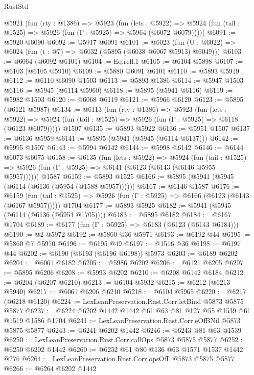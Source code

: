 \begin{lexlean}{RustStd}
\begin{coremodule}
{\begin{coremodule}
{{{{{{{{{{{{{{{{{{{{{{{{{{{{{{{{{{{  @5921
    (fun (rty : @1386) =>
    @5923
      (fun (lets : @5922) =>
      @5924 (fun (tail : @1525) => @5926 (fun (Γ : @5925) => @5964 (@6072 @6079)))))
@6091 := @5920 @6090
@6092 := @5917 @6091
@6101 := @6023 (fun (U : @6022) => @6024 (fun (t : @7) => @6032 (@5895 (@6038 @6067 @5913) @6049)))
@6103 := @6064 (@6092 @6101)
@6104 := Eq.refl.{1}
@6105 := @6104 @5898
@6107 := @6103 (@6105 @5910)
@6109 := @5880 @6091 @6101
@6110 := @5893 @5919
@6112 := @6110 @6090 @1503
@6113 := @5893 @1386
@6114 := @5947 @1503
@6116 := @5945 (@6114 @5960)
@6118 := @5895 (@5941 @6116)
@6119 := @5982 @1503
@6120 := @6068 @6119
@6121 := @5966 @6120
@6123 := @5895 (@6121 @5987)
@6134 := @6113
    (fun (rty : @1386) =>
    @5923
      (fun (lets : @5922) =>
      @5924 (fun (tail : @1525) => @5926 (fun (Γ : @5925) => @6118 (@6123 @6079)))))
    @1507
@6135 := @5893 @5922
@6136 := @5951 @1507
@6137 := @6136 @5959
@6141 := @5895 (@5941 (@5945 (@6114 @6137)))
@6142 := @5995 @1507
@6143 := @5994 @6142
@6144 := @5998 @6142
@6146 := @6144 @6073 @6075
@6158 := @6135
    (fun (lets : @5922) =>
    @5924
      (fun (tail : @1525) => @5926 (fun (Γ : @5925) => @6141 (@6123 (@6143 (@6146 @5955 @5957))))))
    @1587
@6159 := @5893 @1525
@6166 := @5895 (@5941 (@5945 (@6114 (@6136 (@5954 (@1588 @5957))))))
@6167 := @6146 @1587
@6176 := @6159
    (fun (tail : @1525) => @5926 (fun (Γ : @5925) => @6166 (@6123 (@6143 (@6167 @5957)))))
    @1704
@6177 := @5893 @5925
@6182 := @5941 (@5945 (@6114 (@6136 (@5954 @1705))))
@6183 := @5895 @6182
@6184 := @6167 @1704
@6189 := @6177 (fun (Γ : @5925) => @6183 (@6123 (@6143 @6184)))
@6190 := @2 @5972
@6192 := @5860 @36 @5971
@6193 := @6192 @44
@6195 := @5860 @7 @5970
@6196 := @6195 @49
@6197 := @1516 @36
@6198 := @6197 @44
@6202 := @6190 (@6193 (@6196 @6198)) @5973
@6203 := @6189 @6202
@6204 := @6061 @6182
@6205 := @5986 @6202
@6206 := @6121 @6205
@6207 := @5895 @6206
@6208 := @5993 @6202
@6210 := @6208 @6142 @6184
@6212 := @6204 (@6207 @6210)
@6213 := @6104 @5932
@6215 := @6212 (@6213 @5940)
@6217 := @6061 @6206 @6210
@6218 := @6104 @5965
@6220 := @6217 (@6218 @6120)
@6224 := LexLeanPreservation.Rust.Corr.letBind @5873 @5875 @5877
@6237 := @6224 @6202 @1442 @1442 @61 @63 @81 @127 @55 @1539 @61 @1519 @1586 @1704
@6241 := LexLeanPreservation.Rust.Corr.eOfBNil @5873 @5875 @5877
@6243 := @6241 @6202 @1442
@6246 := @6243 @81 @63 @1539
@6250 := LexLeanPreservation.Rust.Corr.callOps @5873 @5875 @5877
@6252 := @6250 @6202 @1442
@6260 := @6252 @61 @80 @136 @63 @1571 @1537 @1442 @276
@6264 := LexLeanPreservation.Rust.Corr.opsOfL @5873 @5875 @5877
@6266 := @6264 @6202 @1442
}}}}}}}}}}}}}}}}}}}}}}}}}}}}}}}}}}}
\end{coremodule}}
\end{coremodule}
\end{lexlean}
